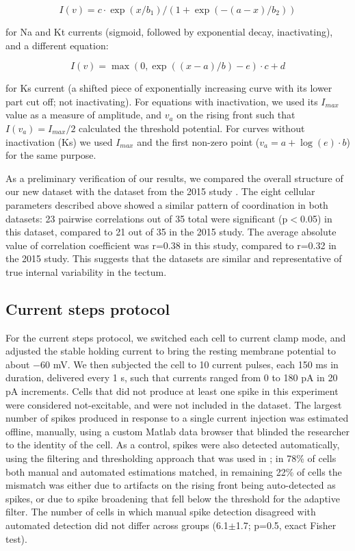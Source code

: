 \documentclass{article}
\begin{document}
$$I(v) = c \cdot \exp(x/b_1)/(1+\exp(-(a-x)/b_2))$$ 

\noindent for Na and Kt currents (sigmoid, followed by exponential decay, inactivating), and a different equation: 

$$I(v)=\max(0,\exp((x-a)/b)-e)\cdot c+d$$ 

\noindent for Ks current (a shifted piece of exponentially increasing curve with its lower part cut off; not inactivating). For equations with inactivation, we used its $I_{max}$ value as a measure of amplitude, and $v_a$ on the rising front such that $I(v_a)=I_{max}/2$ calculated the threshold potential. For curves without inactivation (Ks) we used $I_{max}$ and the first non-zero point ($v_a=a+\log(e)\cdot b$) for the same purpose.

As a preliminary verification of our results, we compared the overall structure of our new dataset with the dataset from the 2015 study \citep{ciarleglio2015}. The eight cellular parameters described above showed a similar pattern of coordination in both datasets: 23 pairwise correlations out of 35 total were significant (p$<$0.05) in this dataset, compared to 21 out of 35 in the 2015 study. The average absolute value of correlation coefficient was r=0.38 in this study, compared to r=0.32 in the 2015 study. This suggests that the datasets are similar and representative of true internal variability in the tectum.

\subsection*{Current steps protocol}

For the current steps protocol, we switched each cell to current clamp mode, and adjusted the stable holding current to bring the resting membrane potential to about $-$60 mV. We then subjected the cell to 10 current pulses, each 150 ms in duration, delivered every 1 s, such that currents ranged from 0 to 180 pA in 20 pA increments. Cells that did not produce at least one spike in this experiment were considered not-excitable, and were not included in the dataset. The largest number of spikes produced in response to a single current injection was estimated offline, manually, using a custom Matlab data browser that blinded the researcher to the identity of the cell. As a control, spikes were also detected automatically, using the filtering and thresholding approach that was used in \citep{ciarleglio2015}; in 78\% of cells both manual and automated estimations matched, in remaining 22\% of cells the mismatch was either due to artifacts on the rising front being auto-detected as spikes, or due to spike broadening that fell below the threshold for the adaptive filter. The number of cells in which manual spike detection disagreed with automated detection did not differ across groups (6.1$\pm$1.7; p=0.5, exact Fisher test).
\end{document}
